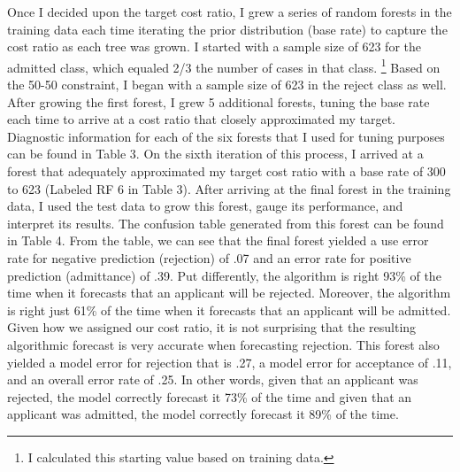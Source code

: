 \documentclass[titlepage]{article}   	%
\begin{document}
Once I decided upon the target cost ratio, I grew a series of random forests in the training data each time iterating the prior distribution (base rate) to capture the cost ratio as each tree was grown. I started with a sample size of 623 for the admitted class, which equaled 2/3 the number of cases in that class. \footnote{\label{myfootnote} I calculated this starting value based on training data.} Based on the 50-50 constraint, I began with a sample size of 623 in the reject class as well. After growing the first forest, I grew 5 additional forests, tuning the base rate each time to arrive at a cost ratio that closely approximated my target. Diagnostic information for each of the six forests that I used for tuning purposes can be found in Table 3. On the sixth iteration of this process, I arrived at a forest that adequately approximated my target cost ratio with a base rate of 300 to 623 (Labeled RF 6 in Table 3).
After arriving at the final forest in the training data, I used the test data to grow this forest, gauge its performance, and interpret its results. The confusion table generated from this forest can be found in Table 4. From the table, we can see that the final forest yielded a use error rate for negative prediction (rejection) of .07 and an error rate for positive prediction (admittance) of .39. Put differently, the algorithm is right 93\% of the time when it forecasts that an applicant will be rejected. Moreover, the algorithm is right just 61\% of the time when it forecasts that an applicant will be admitted. Given how we assigned our cost ratio, it is not surprising that the resulting algorithmic forecast is very accurate when forecasting rejection. This forest also yielded a model error for rejection that is .27, a model error for acceptance of .11, and an overall error rate of .25. In other words, given that an applicant was rejected, the model correctly forecast it 73\% of the time and given that an applicant was admitted, the model correctly forecast it 89\% of the time. 
\end{document}
